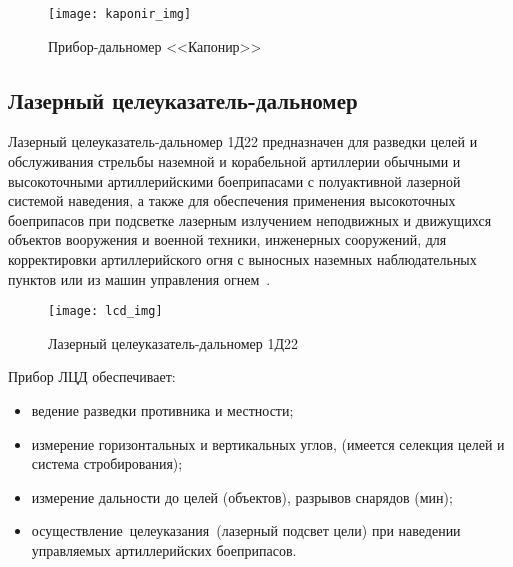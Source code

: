 \begin{figure}
	\centering
	\texttt{[image: kaponir\_img]}
	\caption{Прибор-дальномер <<Капонир>>~\cite{kaponir}}
	\label{fig:lit_reiview:kaponir:kaponir_img}
\end{figure}

\subsection{Лазерный целеуказатель-дальномер}
Лазерный целеуказатель-дальномер 1Д22 предназначен для разведки целей и обслуживания стрельбы наземной и корабельной
артиллерии обычными и высокоточными артиллерийскими боеприпасами с полуактивной лазерной системой наведения, а
также для обеспечения применения высокоточных боеприпасов при подсветке лазерным излучением неподвижных и движущихся объектов
вооружения и военной техники, инженерных сооружений, для корректировки артиллерийского огня с выносных наземных наблюдательных
пунктов или из машин управления огнем~\cite{lcd}.
\label{sub:lit_review:lcd}
\begin{figure}[h]
	\centering
	\texttt{[image: lcd\_img]}
	\caption{Лазерный целеуказатель-дальномер 1Д22~\cite{lcd}}
	\label{fig:lit_reiview:lcd:lcd_img}
\end{figure}

Прибор ЛЦД обеспечивает: 
\begin{itemize}
	\item ведение разведки противника и местности;
	\item измерение горизонтальных и вертикальных углов, (имеется селекция целей и система стробирования);
	\item измерение дальности до целей (объектов), разрывов снарядов (мин);
	\item осуществление целеуказания (лазерный подсвет цели) при наведении управляемых артиллерийских боеприпасов.
\end{itemize}
